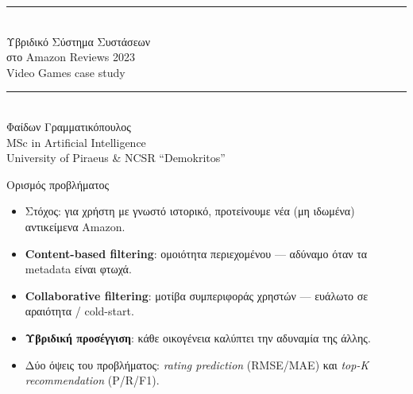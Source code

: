 \documentclass[11pt,aspectratio=169]{beamer}
\newcommand{\code}[1]{{\ttfamily\small #1}}
\begin{document}
{
\begin{frame}[plain]
  \vfill
  \begin{center}
    {\color{accent}\rule{0.55\paperwidth}{1.2pt}}\\[1.1em]
    {\LARGE\color{piraeus}Υβριδικό Σύστημα Συστάσεων\\[0.25em]στο Amazon Reviews 2023}\\[0.7em]
    {\large\color{warm}Video Games case study}\\[1.2em]
    {\color{accent}\rule{0.55\paperwidth}{1.2pt}}\\[1.4em]
    {\large Φαίδων Γραμματικόπουλος \quad\textbar\quad \code{mtn2505}}\\[0.5em]
    {\small\color{inkgray!80}MSc in Artificial Intelligence\\University of Piraeus \& NCSR ``Demokritos''}\\[1.0em]
    {\small\color{piraeus}\code{github.com/Fgram-devAI/amazon-hybrid-recsys}}
  \end{center}
  \vfill
\end{frame}
}

\begin{frame}{Ορισμός προβλήματος}
  \begin{itemize}
    \item Στόχος: για χρήστη με γνωστό ιστορικό, προτείνουμε \alert{νέα} (μη ιδωμένα) αντικείμενα Amazon.
    \item \textbf{Content-based filtering}: ομοιότητα περιεχομένου — αδύναμο όταν τα metadata είναι φτωχά.
    \item \textbf{Collaborative filtering}: μοτίβα συμπεριφοράς χρηστών — ευάλωτο σε αραιότητα / cold-start.
    \item \textbf{Υβριδική προσέγγιση}: κάθε οικογένεια καλύπτει την αδυναμία της άλλης.
    \item Δύο όψεις του προβλήματος: \emph{rating prediction} (RMSE/MAE) και \emph{top-K recommendation} (P/R/F1).
  \end{itemize}
\end{frame}
\end{document}
